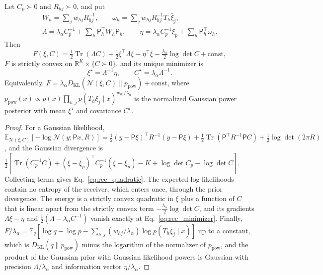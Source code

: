 \documentclass[twoside,11pt]{article}
\begin{document}
\begin{proposition}
\label{prop:rec_closed_form}
Let $C_p\succ0$ and $R_{hj}\succ0$, and put
\begin{equation}
\begin{gathered}
W_h=\sum_jw_{hj}R_{hj}^{-1},\qquad \omega_h=\sum_jw_{hj}R_{hj}^{-1}T_h\bar\xi_j,\\
\Lambda=\lambda_\alpha C_p^{-1}+\sum_h\mathsf P_h^\top W_h\mathsf P_h,\qquad
\eta=\lambda_\alpha C_p^{-1}\xi_p+\sum_h\mathsf P_h^\top\omega_h.
\end{gathered}
\label{eq:rec_stats}
\end{equation}
Then
\begin{equation}
F(\xi,C)=\tfrac12\operatorname{Tr}(\Lambda C)+\tfrac12\xi^\top\Lambda\xi-\eta^\top\xi-\tfrac{\lambda_\alpha}{2}\log\det C+\mathrm{const},
\label{eq:rec_quadratic}
\end{equation}
$F$ is strictly convex on $\mathbb R^K\times\{C\succ0\}$, and its unique minimizer is
\begin{equation}
\xi^\star=\Lambda^{-1}\eta,\qquad C^\star=\lambda_\alpha\Lambda^{-1}.
\label{eq:rec_minimizer}
\end{equation}
Equivalently, $F=\lambda_\alpha D_{\mathrm{KL}}(\mathcal N(\xi,C)\|p_{\mathrm{pow}})+\mathrm{const}$, where $p_{\mathrm{pow}}(x)\propto p(x)\prod_{h,j}p(T_h\bar\xi_j\mid x)^{w_{hj}/\lambda_\alpha}$ is the normalized Gaussian power posterior with mean $\xi^\star$ and covariance $C^\star$.
\end{proposition}
\begin{proof}
For a Gaussian likelihood, $\mathbb E_{\mathcal N(\xi,C)}[-\log\mathcal N(y;\mathsf Px,R)]=\tfrac12(y-\mathsf P\xi)^\top R^{-1}(y-\mathsf P\xi)+\tfrac12\operatorname{Tr}(\mathsf P^\top R^{-1}\mathsf PC)+\tfrac12\log\det(2\pi R)$, and the Gaussian divergence is $\tfrac12[\operatorname{Tr}(C_p^{-1}C)+(\xi-\xi_p)^\top C_p^{-1}(\xi-\xi_p)-K+\log\det C_p-\log\det C]$. Collecting terms gives Eq.~\eqref{eq:rec_quadratic}. The expected log-likelihoods contain no entropy of the receiver, which enters once, through the prior divergence. The energy is a strictly convex quadratic in $\xi$ plus a function of $C$ that is linear apart from the strictly convex term $-\tfrac{\lambda_\alpha}2\log\det C$, and its gradients $\Lambda\xi-\eta$ and $\tfrac12(\Lambda-\lambda_\alpha C^{-1})$ vanish exactly at Eq.~\eqref{eq:rec_minimizer}. Finally, $F/\lambda_\alpha=\mathbb E_q[\log q-\log p-\sum_{h,j}(w_{hj}/\lambda_\alpha)\log p(T_h\bar\xi_j\mid x)]$ up to a constant, which is $D_{\mathrm{KL}}(q\|p_{\mathrm{pow}})$ minus the logarithm of the normalizer of $p_{\mathrm{pow}}$, and the product of the Gaussian prior with Gaussian likelihood powers is Gaussian with precision $\Lambda/\lambda_\alpha$ and information vector $\eta/\lambda_\alpha$.
\end{proof}
\end{document}
